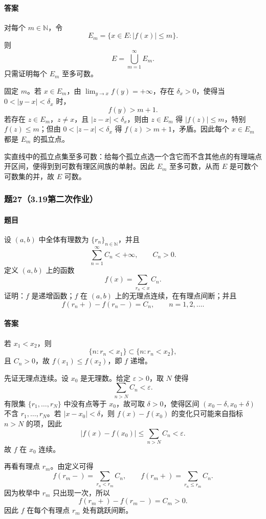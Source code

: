 \documentclass{article}
\newcommand{\N}{\mathbb{N}}
\newcommand{\eps}{\varepsilon}
\begin{document}
	\paragraph{答案}对每个 $m\in\N$，令
	\[
	E_m=\{x\in E: |f(x)|\le m\}.
	\]
	则
	\[
	E=\bigcup_{m=1}^{\infty}E_m.
	\]
	只需证明每个 $E_m$ 至多可数。
	
	固定 $m$。若 $x\in E_m$，由 $\lim_{y\to x}f(y)=+\infty$，存在 $\delta_x>0$，使得当 $0<|y-x|<\delta_x$ 时，
	\[
	f(y)>m+1.
	\]
	若存在 $z\in E_m$，$z\ne x$，且 $|z-x|<\delta_x$，则由 $z\in E_m$ 得 $|f(z)|\le m$，特别 $f(z)\le m$；但由 $0<|z-x|<\delta_x$ 得 $f(z)>m+1$，矛盾。因此每个 $x\in E_m$ 都是 $E_m$ 的孤立点。
	
	实直线中的孤立点集至多可数：给每个孤立点选一个含它而不含其他点的有理端点开区间，便得到到可数有理区间族的单射。因此 $E_m$ 至多可数，从而 $E$ 是可数个可数集的并，故 $E$ 可数。
	
	\subsubsection*{题27（3.19第二次作业）}
	\paragraph{题目}设 $(a,b)$ 中全体有理数为 $\{r_n\}_{n\in\N}$，并且
	\[
	\sum_{n=1}^{\infty}C_n<+\infty,
	\qquad C_n>0.
	\]
	定义 $(a,b)$ 上的函数
	\[
	f(x)=\sum_{r_n<x}C_n.
	\]
	证明：$f$ 是递增函数；$f$ 在 $(a,b)$ 上的无理点连续，在有理点间断；并且
	\[
	f(r_n+)-f(r_n-)=C_n,
	\qquad n=1,2,\ldots.
	\]
	
	\paragraph{答案}若 $x_1<x_2$，则
	\[
	\{n:r_n<x_1\}\subset\{n:r_n<x_2\},
	\]
	且 $C_n>0$，故 $f(x_1)\le f(x_2)$，即 $f$ 递增。
	
	先证无理点连续。设 $x_0$ 是无理数。给定 $\eps>0$，取 $N$ 使得
	\[
	\sum_{n>N}C_n<\eps.
	\]
	有限集 $\{r_1,
	\ldots,r_N\}$ 中没有点等于 $x_0$，故可取 $\delta>0$，使得区间 $(x_0-\delta,x_0+\delta)$ 不含 $r_1,
	\ldots,r_N$。若 $|x-x_0|<\delta$，则 $f(x)-f(x_0)$ 的变化只可能来自指标 $n>N$ 的项，因此
	\[
	|f(x)-f(x_0)|\le\sum_{n>N}C_n<\eps.
	\]
	故 $f$ 在 $x_0$ 连续。
	
	再看有理点 $r_m$。由定义可得
	\[
	f(r_m-)=\sum_{r_n<r_m}C_n,
	\qquad
	f(r_m+)=\sum_{r_n\le r_m}C_n.
	\]
	因为枚举中 $r_m$ 只出现一次，所以
	\[
	f(r_m+)-f(r_m-)=C_m>0.
	\]
	因此 $f$ 在每个有理点 $r_m$ 处有跳跃间断。
	
\end{document}
